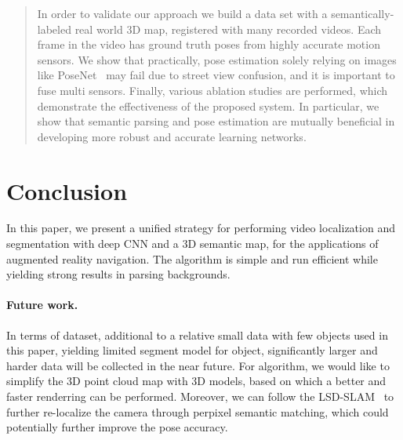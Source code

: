 \documentclass[10pt,twocolumn,letterpaper]{article}
\begin{document}
\begin{abstract}
In order to validate our approach we build a data set with a semantically-labeled real world 3D map, registered with many recorded videos. Each frame in the video has ground truth poses from highly accurate motion sensors.
We show that practically, pose estimation solely relying on images like PoseNet~\cite{Kendall_2015_ICCV} may fail due to street view confusion, and it is important to fuse multi sensors.  Finally, various ablation studies are performed, which demonstrate the effectiveness of the proposed system. In particular, we show that semantic parsing and pose estimation are mutually beneficial in developing more robust and accurate learning networks.


\end{abstract}








\section{Conclusion}
\label{sec:conclusion}
In this paper, we present a unified strategy for performing video localization and segmentation with deep CNN and a 3D semantic map, for the applications of augmented reality navigation. The algorithm is simple and run efficient while yielding strong results in parsing backgrounds.

\paragraph{Future work.} In terms of dataset, additional to a relative small data with few objects used in this paper, yielding limited segment model for object, significantly larger and harder data will be collected in the near future.
For algorithm, we would like to simplify the 3D point cloud map with 3D models, based on which a better and faster renderring can be performed.
Moreover, we can follow the LSD-SLAM~\cite{engel2014lsd} to further re-localize the camera through perpixel semantic matching, which could potentially further improve the pose accuracy.

%

{\small


}
\end{document}
